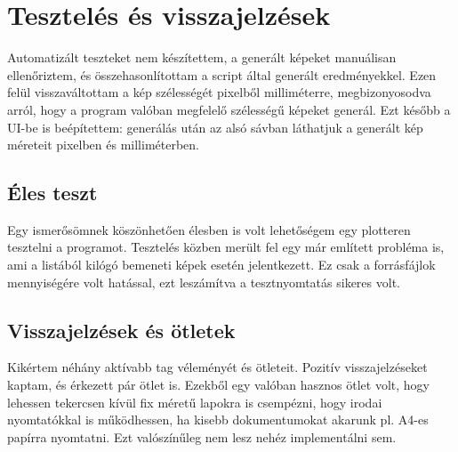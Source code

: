 \chapter{Tesztelés és visszajelzések}

Automatizált teszteket nem készítettem, a generált képeket manuálisan ellenőriztem, és összehasonlítottam a script által generált eredményekkel. Ezen felül visszaváltottam a kép szélességét pixelből milliméterre, megbizonyosodva arról, hogy a program valóban megfelelő szélességű képeket generál. Ezt később a UI-be is beépítettem: generálás után az alsó sávban láthatjuk a generált kép méreteit pixelben és milliméterben.

\section{Éles teszt}

Egy ismerősömnek köszönhetően élesben is volt lehetőségem egy plotteren tesztelni a programot. Tesztelés közben merült fel egy már említett probléma is, ami a listából kilógó bemeneti képek esetén jelentkezett. Ez csak a forrásfájlok mennyiségére volt hatással, ezt leszámítva a tesztnyomtatás sikeres volt.

\section{Visszajelzések és ötletek}

Kikértem néhány aktívabb tag véleményét és ötleteit. Pozitív visszajelzéseket kaptam, és érkezett pár ötlet is. Ezekből egy valóban hasznos ötlet volt, hogy lehessen tekercsen kívül fix méretű lapokra is csempézni, hogy irodai nyomtatókkal is működhessen, ha kisebb dokumentumokat akarunk pl. A4-es papírra nyomtatni. Ezt valószínűleg nem lesz nehéz implementálni sem.
